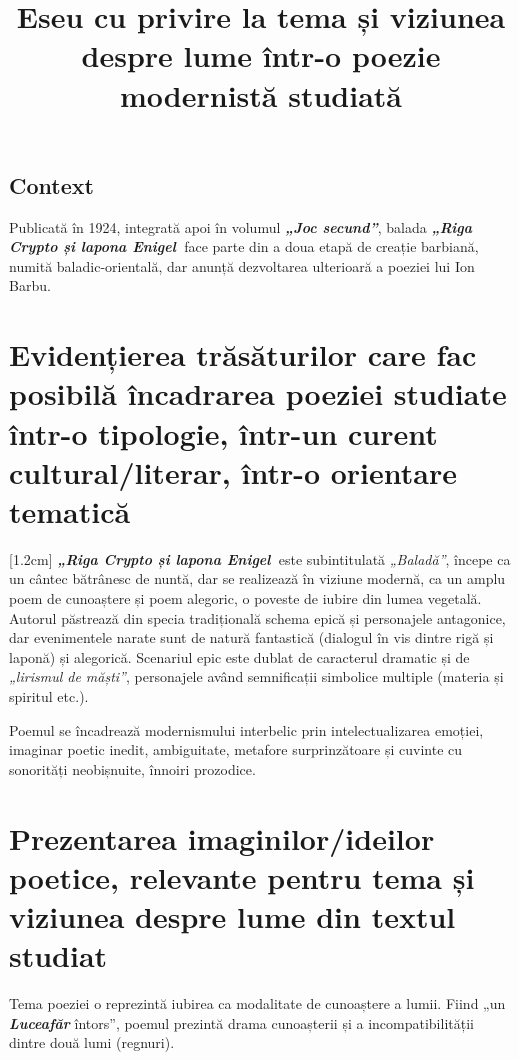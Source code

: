 \documentclass[
12pt,                        %
a4paper                      %
]{article}
\title{Eseu cu privire la tema și viziunea despre lume într-o poezie modernistă studiată}
\date{}   %
\author{} %
\newcommand{\textbfit}[1]{\textbf{\textit{#1}}} %
\newcommand{\operatitle}{\textbfit{„Riga Crypto și lapona Enigel\ }} %
\newcommand{\operaauthor}{Ion Barbu} %
\begin{document}
\maketitle %



\subsection{Context}

Publicată în 1924, integrată apoi în volumul \textbfit{„Joc secund”}, balada \operatitle face parte din a doua etapă de creație barbiană, numită baladic-orientală, dar anunță dezvoltarea ulterioară a poeziei lui \operaauthor.

\section{Evidențierea trăsăturilor care fac posibilă încadrarea poeziei studiate într-o tipologie, într-un curent cultural/literar, într-o orientare tematică}

[1.2cm]
\operatitle este subintitulată \textit{„Baladă”}, începe ca un cântec bătrânesc de nuntă, dar se realizează în viziune modernă, ca un amplu poem de cunoaștere și poem alegoric, o poveste de iubire din lumea vegetală. Autorul păstrează din specia tradițională schema epică și personajele antagonice, dar evenimentele narate sunt de natură fantastică (dialogul în vis dintre rigă și laponă) și alegorică. Scenariul epic este dublat de caracterul dramatic și de \textit{„lirismul de măști”}, personajele având semnificații simbolice multiple (materia și spiritul etc.).

Poemul se încadrează modernismului interbelic prin intelectualizarea emoției, imaginar poetic inedit, ambiguitate, metafore surprinzătoare și cuvinte cu sonorități ne\-o\-biș\-nu\-i\-te, înnoiri prozodice.

\section{Prezentarea imaginilor/ideilor poetice, relevante pentru tema și viziunea despre lume din textul studiat}

Tema poeziei o reprezintă iubirea ca modalitate de cunoaștere a lumii. Fiind „un \textbfit{Luceafăr} întors”, poemul prezintă drama cunoașterii și a incompatibilității dintre două lumi (regnuri).
\end{document}
